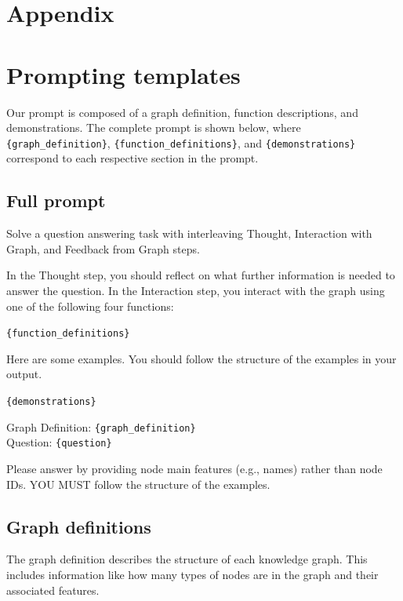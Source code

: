 \newpage
\appendix
\section*{Appendix}
\renewcommand{\thesubsection}{A.\arabic{subsection}}
\renewcommand{\thesubsubsection}{A.\arabic{subsection}.\arabic{subsubsection}}

\section{Prompting templates}
Our prompt is composed of a graph definition, function descriptions, and demonstrations. The complete prompt is shown below, where \texttt{\{graph\_definition\}}, \texttt{\{function\_definitions\}}, and \texttt{\{demonstrations\}} correspond to each respective section in the prompt.


\subsection{Full prompt}
Solve a question answering task with interleaving Thought, Interaction with Graph, and Feedback from Graph steps. 

In the Thought step, you should reflect on what further information is needed to answer the question. In the Interaction step, you interact with the graph using one of the following four functions:

\texttt{\{function\_definitions\}}

Here are some examples. You should follow the structure of the examples in your output. 

\texttt{\{demonstrations\}}




\vspace{0.2cm}
Graph Definition: \texttt{\{graph\_definition\}} \\
Question: \texttt{\{question\}} 

\vspace{0.2cm}
Please answer by providing node main features (e.g., names) rather than node IDs. YOU MUST follow the structure of the examples.



\subsection{Graph definitions}
The graph definition describes the structure of each knowledge graph. This includes information like how many types of nodes are in the graph and their associated features.  

